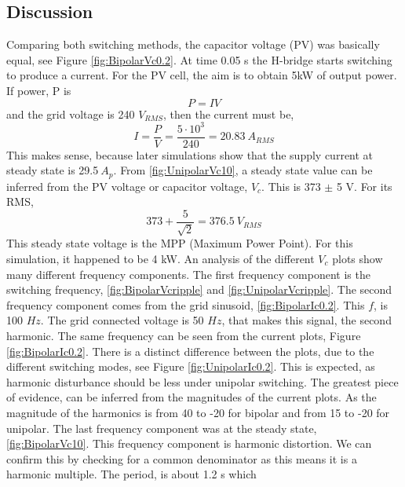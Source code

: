 \documentclass[12pt,twoside]{scrartcl}
\begin{document}
\subsection{Discussion}
\label{sec:discussion}
Comparing both switching methods, the capacitor voltage (PV) was basically equal, see Figure \ref{fig:BipolarVc0.2}. 
At time 0.05 s the H-bridge starts switching to produce a current. 
For the PV cell, the aim is to obtain 5kW of output power. If power, P is 
\begin{equation}
    P = IV
\end{equation}
and the grid voltage is 240 $V_{RMS}$, then the current must be,
\begin{equation}
    I = \dfrac{P}{V} = \dfrac{5\cdot10^3}{240} = 20.83 \: A_{RMS}
\end{equation}
This makes sense, because later simulations show that 
the supply current at steady state is 29.5$\:A_{p}$. From \ref{fig:UnipolarVc10}, 
a steady state value can be inferred from the PV voltage or capacitor 
voltage, $V_c$. This is 373 $\pm$ 5 V. For its RMS,
\begin{equation}
    373 + \dfrac{5}{\sqrt{2}} = 376.5 \: V_{RMS}
    \label{eq:V_rms}
\end{equation} 
This steady state voltage is the MPP (Maximum Power Point). For this simulation, it happened to be 4 kW.
\newline
\newline
\noindent
An analysis of the different $V_c$ plots show many different frequency components.
The first frequency component is the switching frequency, \ref{fig:BipolarVcripple} and \ref{fig:UnipolarVcripple}.
The second frequency component comes from the grid sinusoid, \ref{fig:BipolarIc0.2}. This $f$, is 100 $Hz$. The grid connected voltage is 50 $Hz$,
that makes this signal, the second harmonic. The same frequency can 
be seen from the current plots, Figure \ref{fig:BipolarIc0.2}.
There is a distinct difference between the plots, due to the different switching modes, 
see Figure \ref{fig:UnipolarIc0.2}. This is expected, as 
harmonic disturbance should be less under unipolar switching. The greatest piece of 
evidence, can be inferred from the magnitudes of the current plots. 
As the magnitude of the harmonics is from 40 to -20
for bipolar and from 15 to -20 for unipolar. The last
frequency component was at the steady state, \ref{fig:BipolarVc10}. This frequency component 
is harmonic distortion. We can confirm this by checking for a common denominator as this means it is a harmonic multiple. The period, is about 1.2 s which 
\end{document}
